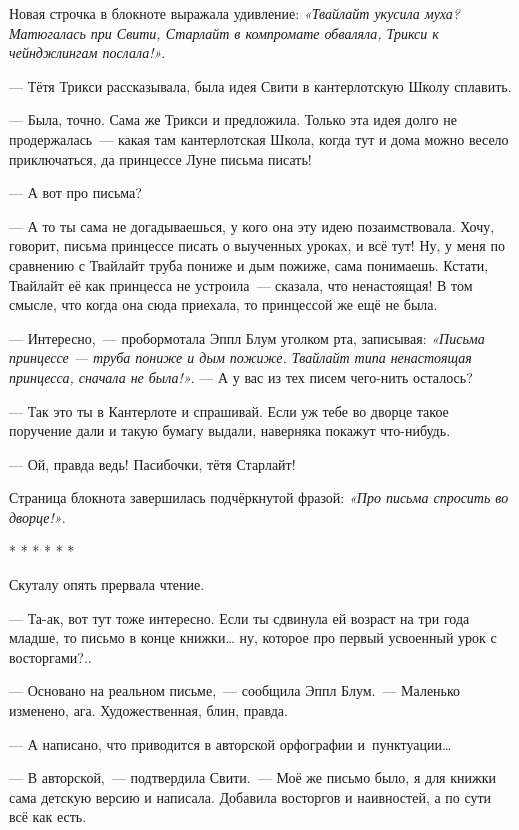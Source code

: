 \documentclass[fontsize=11pt,a5paper,titlepage=firstcover]{scrbook}
\begin{document}
Новая строчка в блокноте выражала удивление: \emph{«Твайлайт укусила муха? Матюгалась при Свити, Старлайт в компромате обваляла, Трикси к чейнджлингам послала!»}.

--- Тётя Трикси рассказывала, была идея Свити в кантерлотскую Школу сплавить.

--- Была, точно. Сама же Трикси и предложила. Только эта идея долго не продержалась~--- какая там кантерлотская Школа, когда тут и дома можно весело приключаться, да принцессе Луне письма писать!

--- А вот про письма?

--- А то ты сама не догадываешься, у кого она эту идею позаимствовала. Хочу, говорит, письма принцессе писать о выученных уроках, и всё тут! Ну, у меня по сравнению с Твайлайт труба пониже и дым пожиже, сама понимаешь. Кстати, Твайлайт её как принцесса не устроила~--- сказала, что ненастоящая! В том смысле, что когда она сюда приехала, то принцессой же ещё не была.

--- Интересно,~--- пробормотала Эппл Блум уголком рта, записывая: \emph{«Письма принцессе --- труба пониже и дым пожиже. Твайлайт типа ненастоящая принцесса, сначала не была!»}. --- А у вас из тех писем чего-нить осталось?

--- Так это ты в Кантерлоте и спрашивай. Если уж тебе во дворце такое поручение дали и такую бумагу выдали, наверняка покажут что-нибудь.

--- Ой, правда ведь! Пасибочки, тётя Старлайт!

Страница блокнота завершилась подчёркнутой фразой: \emph{«Про письма спросить во дворце!»}.

\vspace{5mm}
\begin{center}* * * * * *\end{center}
\vspace{5mm}

Скуталу опять прервала чтение.

--- Та-ак, вот тут тоже интересно. Если ты сдвинула ей возраст на три года младше, то письмо в конце книжки{\ldots} ну, которое про первый усвоенный урок с восторгами?..

--- Основано на реальном письме,~--- сообщила Эппл Блум.~--- Маленько изменено, ага. Художественная, блин, правда.

--- А написано, что приводится в авторской орфографии и~пунктуации{\ldots}

--- В авторской,~--- подтвердила Свити.~--- Моё же письмо было, я для книжки сама детскую версию и написала. Добавила восторгов и наивностей, а по сути всё как есть.
\end{document}
